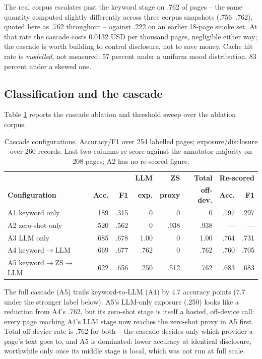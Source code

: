 \documentclass[conference]{IEEEtran}
\let\IEEEoriginalcaption\caption
\renewcommand{\caption}[1]{\IEEEoriginalcaption{\footnotesize #1}}
\begin{document}
The real corpus escalates past the keyword stage on .762 of pages -- the
same quantity computed slightly differently across three corpus
snapshots (.756--.762), quoted here as .762 throughout -- against .222 on
an earlier 18-page smoke set. At that rate the cascade costs 0.0132 USD
per thousand pages, negligible either way; the cascade is worth building
to control disclosure, not to save money. Cache hit rate is
\emph{modelled}, not measured: 57 percent under a uniform mood
distribution, 83 percent under a skewed one.

\subsection{Classification and the cascade}
\label{sec:res-classification}

Table \ref{tab:tiers} reports the cascade ablation and threshold sweep
over the ablation corpus.

\begin{table}[t]
\caption{Cascade configurations. Accuracy/F1 over 254 labelled pages;
exposure/disclosure over 260 records. Last two columns re-score against
the annotator majority on 208 pages; A2 has no re-scored figure.}
\label{tab:tiers}
\begin{center}
\scriptsize
\setlength{\tabcolsep}{2.5pt}
\begin{tabular}{lrrrrrrr}
\toprule
& & & \textbf{LLM} & \textbf{ZS} & \textbf{Total} & \multicolumn{2}{c}{\textbf{Re-scored}} \\
\textbf{Configuration} & \textbf{Acc.} & \textbf{F1} & \textbf{exp.} & \textbf{proxy} & \textbf{off-dev.} & \textbf{Acc.} & \textbf{F1} \\
\midrule
A1 keyword only & .189 & .315 & 0 & 0 & 0 & .197 & .297 \\
A2 zero-shot only & .520 & .562 & 0 & .938 & .938 & --- & --- \\
A3 LLM only & .685 & .678 & 1.00 & 0 & 1.00 & .764 & .731 \\
A4 keyword$\to$LLM & .669 & .677 & .762 & 0 & .762 & .760 & .705 \\
A5 keyword$\to$ZS$\to$LLM & .622 & .656 & .250 & .512 & .762 & .683 & .683 \\
\bottomrule
\end{tabular}
\end{center}
\end{table}

The full cascade (A5) trails keyword-to-LLM (A4) by 4.7 accuracy points
(7.7 under the stronger label below). A5's LLM-only exposure (.250) looks
like a reduction from A4's .762, but its zero-shot stage is itself a
hosted, off-device call: every page reaching A4's LLM stage now reaches
the zero-shot proxy in A5 first. Total off-device rate is .762 for both
-- the cascade decides only which provider a page's text goes to, and A5
is dominated: lower accuracy at identical disclosure, worthwhile only once
its middle stage is local, which was not run at full scale.
\end{document}
